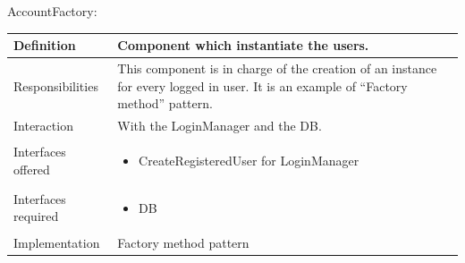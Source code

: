\documentclass[a4paper,11pt]{report} %
\begin{document}
	\pagebreak
	\centerline{AccountFactory:}
	\begin{center}
		\begin{tabular}{| l | p{9cm} |}\hline
			Definition & Component which instantiate the users.\\\hline
			Responsibilities & This component is in charge of the creation of an instance for every logged in user. It is an example of ``Factory method'' pattern.\\\hline
			Interaction & With the LoginManager and the DB.\\\hline
			Interfaces offered & \begin{itemize}
				\item CreateRegisteredUser for LoginManager
			\end{itemize}\\\hline
			Interfaces required & \begin{itemize}
				\item DB
			\end{itemize}\\\hline
			Implementation & Factory method pattern\\\hline
		\end{tabular}
	\end{center}
			
	\pagebreak
\end{document}

